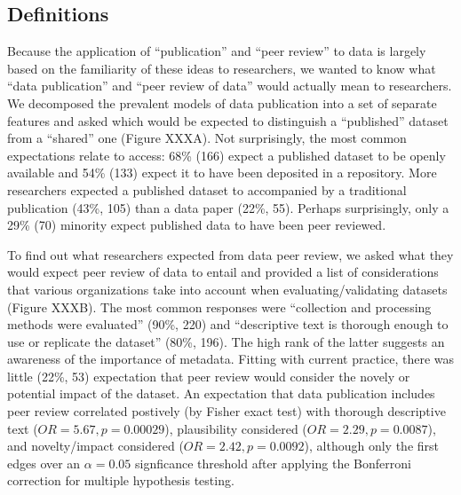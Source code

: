 \documentclass[10pt]{article}
\begin{document}
\subsection*{Definitions}

Because the application of ``publication'' and ``peer review'' to data is largely based on the familiarity of these ideas to researchers, we wanted to know what ``data publication'' and ``peer review of data'' would actually mean to researchers.
We decomposed the prevalent models of data publication into a set of separate features and asked which would be expected to distinguish a ``published'' dataset from a ``shared'' one (Figure XXXA).
Not surprisingly, the most common expectations relate to access: 68\% (166) expect a published dataset to be openly available and 54\% (133) expect it to have been deposited in a repository.
More researchers expected a published dataset to accompanied by a traditional publication (43\%, 105) than a data paper (22\%, 55).
Perhaps surprisingly, only a 29\% (70) minority expect published data to have been peer reviewed.

To find out what researchers expected from data peer review, we asked what they would expect peer review of data to entail and provided a list of considerations that various organizations take into account when evaluating/validating datasets (Figure XXXB).
The most common responses were ``collection and processing methods were evaluated'' (90\%, 220) and ``descriptive text is thorough enough to use or replicate the dataset'' (80\%, 196).
The high rank of the latter suggests an awareness of the importance of metadata.
Fitting with current practice, there was little (22\%, 53) expectation that peer review would consider the novely or potential impact of the dataset.
An expectation that data publication includes peer review correlated postively (by Fisher exact test) with thorough descriptive text ($OR= 5.67, p= 0.00029$), plausibility considered ($OR= 2.29, p= 0.0087$), and novelty/impact considered ($OR= 2.42, p= 0.0092$), although only the first edges over an $\alpha= 0.05$ signficance threshold after applying the Bonferroni correction for multiple hypothesis testing.
\end{document}
